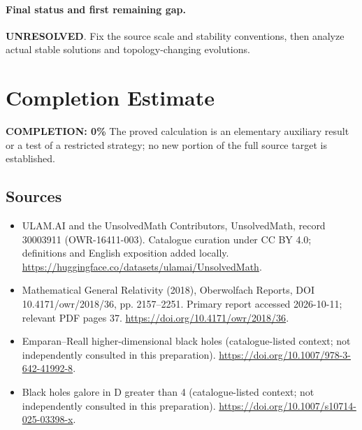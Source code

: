 \documentclass[11pt]{article}
\begin{document}
\paragraph{Final status and first remaining gap.}
\textbf{UNRESOLVED}. Fix the source scale and stability conventions, then analyze actual stable solutions and topology-changing evolutions.

\section{Completion Estimate}
\noindent\textbf{COMPLETION: 0\%}
The proved calculation is an elementary auxiliary result or a test of a restricted strategy; no new portion of the full source target is established.

\subsection{Sources}
\begin{itemize}
\item[\hypertarget{source:30003911:1}{S1}] ULAM.AI and the UnsolvedMath Contributors, UnsolvedMath, record 30003911 (OWR-16411-003). Catalogue curation under CC BY 4.0; definitions and English exposition added locally.
\url{https://huggingface.co/datasets/ulamai/UnsolvedMath}.
\item[\hypertarget{source:30003911:2}{S2}] Mathematical General Relativity (2018), Oberwolfach Reports, DOI 10.4171/owr/2018/36, pp. 2157--2251. Primary report accessed 2026-10-11; relevant PDF pages 37.
\url{https://doi.org/10.4171/owr/2018/36}.
\item[\hypertarget{source:30003911:3}{S3}] Emparan--Reall higher-dimensional black holes (catalogue-listed context; not independently consulted in this preparation).
\url{https://doi.org/10.1007/978-3-642-41992-8}.
\item[\hypertarget{source:30003911:4}{S4}] Black holes galore in D greater than 4 (catalogue-listed context; not independently consulted in this preparation).
\url{https://doi.org/10.1007/s10714-025-03398-x}.
\end{itemize}
\label{end:30003911}
\end{document}
